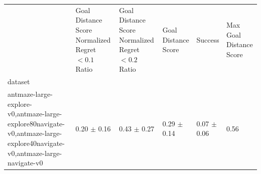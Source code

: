\begin{tabular}{llllll}
\toprule
 & Goal Distance Score Normalized Regret $< 0.1$ Ratio & Goal Distance Score Normalized Regret $< 0.2$ Ratio & Goal Distance Score & Success & Max Goal Distance Score \\
dataset &  &  &  &  &  \\
\midrule
antmaze-large-explore-v0,antmaze-large-explore80navigate-v0,antmaze-large-explore40navigate-v0,antmaze-large-navigate-v0 & 0.20 $\pm$ 0.16 & 0.43 $\pm$ 0.27 & 0.29 $\pm$ 0.14 & 0.07 $\pm$ 0.06 & 0.56 \\
\bottomrule
\end{tabular}
